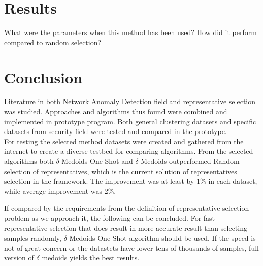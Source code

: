 \documentclass[thesis=B,english]{FITthesis}[2012/10/20]
\begin{document}

\chapter{Results}

What were the parameters when this method has been used?
How did it perform compared to random selection?




\chapter{Conclusion}
Literature in both Network Anomaly Detection field and representative selection was studied.
Approaches and algorithms thus found were combined and implemented in prototype program.
Both general clustering datasets and specific datasets from security field were tested and compared in the prototype. \\ 

For testing the selected method datasets were created and gathered from the internet to create a diverse testbed for comparing algorithms.
From the selected algorithms both $\delta$-Medoids One Shot and $\delta$-Medoids outperformed Random selection of representatives, which is the current solution of representatives selection in the framework.
The improvement was at least by 1\% in each dataset, while average improvement was 2\%.  \\


If compared by the requirements from the definition of representative selection problem as we approach it, the following can be concluded.
For fast representative selection that does result in more accurate result than selecting samples randomly, $\delta$-Medoids One Shot algorithm should be used.
If the speed is not of great concern or the datastets have lower tens of thousands of samples, full version of $\delta$ medoids yields the best results.




\appendix
\end{document}
